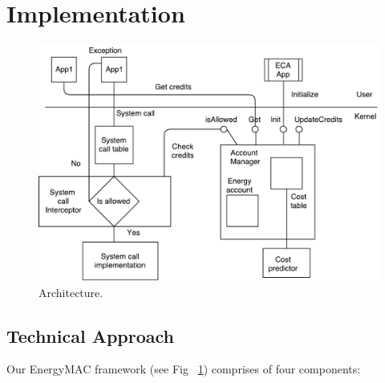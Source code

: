 \section{Implementation}\label{impl}

\begin{figure}[t]
\centering
\includegraphics[width=0.8\linewidth]{Figs/mobileapp}
\caption{Architecture.}
\label{fig:Architecture}
\centering
\end{figure}


\subsection{Technical Approach}

Our EnergyMAC framework (see Fig ~\ref{fig:Architecture}) comprises of four components:

